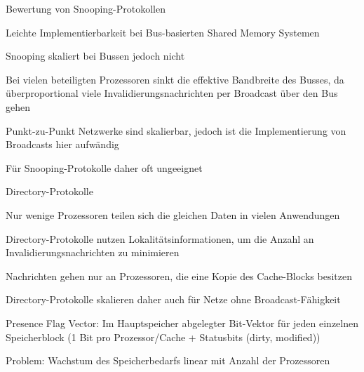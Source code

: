 \documentclass[10pt,landscape]{article}
\begin{document}
\begin{multicols}{3}
\begin{itemize*}
  \end{itemize*}
  Bewertung von Snooping-Protokollen
  \begin{itemize*}
    \item Leichte Implementierbarkeit bei Bus-basierten Shared Memory Systemen
    \item Snooping skaliert bei Bussen jedoch nicht
    \item Bei vielen beteiligten Prozessoren sinkt die effektive Bandbreite des Busses, da überproportional viele Invalidierungsnachrichten per Broadcast über den Bus gehen
    \item Punkt-zu-Punkt Netzwerke sind skalierbar, jedoch ist die Implementierung von Broadcasts hier aufwändig
    \item Für Snooping-Protokolle daher oft ungeeignet
  \end{itemize*}
  
  Directory-Protokolle
  \begin{itemize*}
    \item Nur wenige Prozessoren teilen sich die gleichen Daten in vielen Anwendungen
    \item Directory-Protokolle nutzen Lokalitätsinformationen, um die Anzahl an Invalidierungsnachrichten zu minimieren
    \item Nachrichten gehen nur an Prozessoren, die eine Kopie des Cache-Blocks besitzen
    \item Directory-Protokolle skalieren daher auch für Netze ohne Broadcast-Fähigkeit
    \item Presence Flag Vector: Im Hauptspeicher abgelegter Bit-Vektor für jeden einzelnen Speicherblock (1 Bit pro Prozessor/Cache + Statusbits (dirty, modified))
    \item Problem: Wachstum des Speicherbedarfs linear mit Anzahl der Prozessoren
  \end{itemize*}  
  
\end{multicols}
\end{document}
